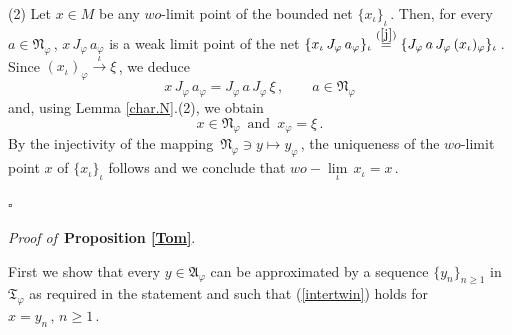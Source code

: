 \documentclass[reqno]{amsart}
\theoremstyle{definition}
\theoremstyle{remark}
\numberwithin{equation}{section}
\theoremstyle{plain}
\begin{document}
(2) Let $x\in M$ be any $wo$-limit point of the bounded net
$\{ x_\iota\}_\iota\,$. Then, for every $a\in\mathfrak N_\varphi\,$,
$x\, J_\varphi\, a_\varphi$ is a weak limit point of the net
$\{ x_\iota\, J_\varphi\, a_\varphi\}_\iota \overset{(\ref{j})}{=}
\{ J_\varphi\, a\, J_\varphi\, (x_\iota)_\varphi\}_\iota\,$. Since
$(x_\iota)_\varphi\overset{\iota}{\longrightarrow}\xi\,$, we deduce
\begin{equation*}
x\, J_\varphi\, a_\varphi =J_\varphi\, a\, J_\varphi\,\xi\, ,
\qquad a\in\mathfrak N_\varphi
\end{equation*}
and, using Lemma \ref{char.N}.(2), we obtain
\begin{equation*}
x\in\mathfrak N_\varphi\,\text{ and }\, x_\varphi =\xi\, .
\end{equation*}
By the injectivity of the mapping $\,\mathfrak N_\varphi\ni y
\longmapsto y_\varphi\,$, the uniqueness of the $wo$-limit point
$x$ of $\{ x_\iota\}_\iota$ follows and we conclude that
$wo-\lim\limits_\iota\, x_\iota =x\,$.

\hfill $\square\quad$

\medskip

{\it Proof of }$\,${\bf Proposition \ref{Tom}}.
\medskip

First we show that every $y\in\mathfrak A_\varphi$ can be approximated
by a sequence $\{ y_n\}_{n\geq 1}$ in $\mathfrak T_\varphi$ as
required in the statement and such that (\ref{intertwin}) holds for
$x=y_n\, ,\, n\geq 1\,$.
\end{document}
